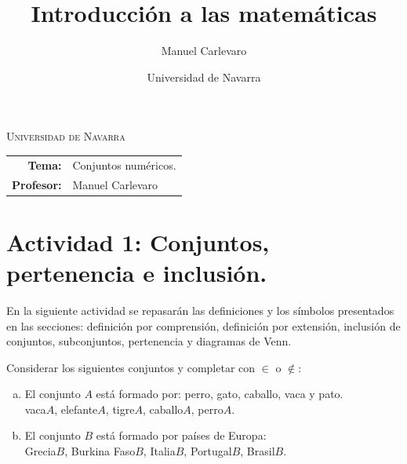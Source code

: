 \documentclass[11pt]{article}
\title{Introducción a las matemáticas}
\author{Manuel Carlevaro}
\date{Universidad de Navarra}
\begin{document}

\begin{center}
\end{center} 

\begin{center}
\vspace{1em}
\Large{\textsc{Universidad de Navarra}} 
\end{center}

 \vspace{1em}

\begin{center}
\begin{tabular}{r l}
 \textbf{Tema:} & Conjuntos numéricos. \\
 \textbf{Profesor:} & Manuel Carlevaro \\
\end{tabular}\end{center}

\vspace{2em}
\section*{Actividad 1: Conjuntos, pertenencia e inclusión.}

En la siguiente actividad se repasarán las definiciones y los símbolos presentados en las secciones: definición por comprensión, definición por extensión, inclusión de conjuntos, subconjuntos, pertenencia y diagramas de Venn.

\begin{exercise}
Considerar los siguientes conjuntos y completar con $\in$ o $\notin$:
\begin{enumerate}[a)]
    \item El conjunto $A$ está formado por: perro, gato, caballo, vaca y pato. \\[1.0em]
        vaca$A$, elefante\blank{}$A$, tigre\blank{}$A$, caballo\blank{}$A$, perro\blank{}$A$.
    \item El conjunto $B$ está formado por países de Europa: \\[1.0em]
        Grecia\blank{}$B$, Burkina Faso\blank{}$B$, Italia\blank{}$B$, Portugal\blank{}$B$, Brasil\blank{}$B$. 
\end{enumerate}
\end{exercise}
\end{document}
